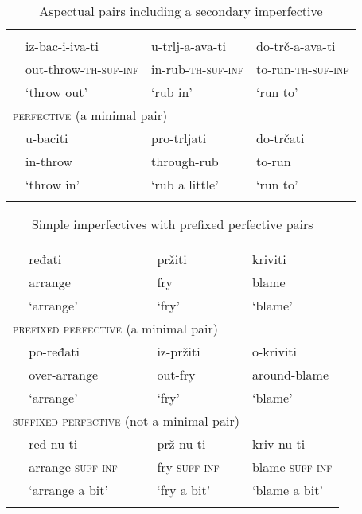\documentclass[output=paper]{langscibook}
\begin{document}
\begin{table}[H]
\begin{tabularx}{\textwidth}{lXXX}
\lsptoprule
\multicolumn{3}{l}{\textsc{imperfective} (class (a))}\\
& iz-bac-i-iva-ti    & u-trlj-a-ava-ti    & do-trč-a-ava-ti  \\
    & out-throw-\textsc{th-suf-inf} & in-rub-\textsc{th-suf-inf} & to-run-\textsc{th-suf-inf}  \\
    & `throw out'   & `rub in'      & `run to'    
    \medskip\\
\multicolumn{3}{l}{\textsc{perfective} (a minimal pair)}\\
& u-baciti    & pro-trljati    & do-trčati \\ 
& in-throw & through-rub & to-run \\ 
    & `throw in'   & `rub a little'      & `run to'\\\lspbottomrule
\end{tabularx}
\caption{Aspectual pairs including a secondary imperfective} 
\label{ars:tab:prefixed-table}
\end{table}

\begin{table}[H]
\begin{tabularx}{\textwidth}{lXXX}
\lsptoprule
\multicolumn{3}{l}{\textsc{imperfective} (class (b))}\\
& ređati    & pržiti    & kriviti  \\
    & arrange & fry & blame  \\
    & `arrange'   & `fry'      & `blame'    \medskip\\
\multicolumn{3}{l}{\textsc{prefixed perfective} (a minimal pair)}\\
& po-ređati & iz-pržiti & o-kriviti    \\ 
    & over-arrange & out-fry & around-blame \\ 
    & `arrange'   & `fry'      & `blame'    \medskip\\
\multicolumn{3}{l}{\textsc{suffixed perfective} (not a minimal pair)}\\
& ređ-nu-ti & prž-nu-ti & kriv-nu-ti    \\ 
    & arrange-\textsc{suff-inf} & fry-\textsc{suff-inf} & blame-\textsc{suff-inf} \\ 
    & `arrange a bit'   & `fry a bit'      & `blame a bit'\\\lspbottomrule
\end{tabularx}
\caption{Simple imperfectives with prefixed perfective pairs}
\label{ars:tab:simplepref-table}
\end{table}\pagebreak
\end{document}
